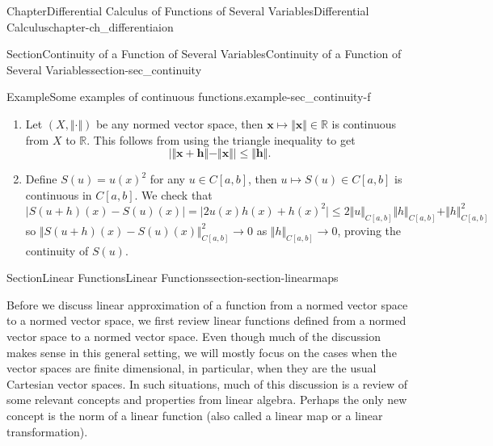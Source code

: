 \documentclass[oneside,10pt,]{book}
\numberwithin{equation}{section}
\newcommand{\bff}{\mathbf{f}}
\newcommand{\bh}{\mathbf{h}}
\newcommand{\bu}{\mathbf{u}}
\newcommand{\bx}{\mathbf{x}}
\newcommand{\bbR}{\mathbb{R}}
\begin{document}
\begin{chapterptx}{Chapter}{Differential Calculus of Functions of Several Variables}{}{Differential Calculus}{}{}{chapter-ch_differentiaion}
\begin{sectionptx}{Section}{Continuity of a Function of Several Variables}{}{Continuity of a Function of Several Variables}{}{}{section-sec_continuity}
\begin{example}{Example}{Some examples of continuous functions.}{example-sec_continuity-f}
\begin{enumerate}[font=\bfseries,label=(\alph*),ref=\alph*]
\par
Suppose \(\bff_1: U\mapsto \bbR^n\) and \(\bff_2: U\mapsto \bbR^n\) are two continuous functions from \(U\) to \(\bbR^n\), then composition with the continuous inner product makes \(\bff_1(\bu)\cdot \bff_2(\bu)\) a continuous function from \(U\) to \(\bbR\).%
\item{}Let \((X, \Vert \cdot \Vert )\) be any normed vector space, then \(\bx \mapsto \Vert \bx\Vert \in \bbR\) is continuous from \(X\) to \(\bbR\). This follows from using the triangle inequality to get%
%
\begin{equation*}
\vert \Vert \bx+\bh\Vert-\Vert \bx\Vert \vert \le \Vert \bh \Vert.
\end{equation*}
\item{}Define \(S(u)=u(x)^{2}\) for any \(u\in C[a, b]\), then \(u\mapsto S(u)\in C[a, b]\) is continuous in \(C[a, b]\). We check that%
\begin{equation*}
\vert S(u+h)(x)-S(u)(x)\vert =\vert 2 u(x)h(x)+h(x)^{2}\vert \le 2 \Vert u \Vert_{C[a, b]} \Vert h\Vert_{C[a, b]}+
\Vert h\Vert_{C[a, b]}^{2}
\end{equation*}
so \(\Vert S(u+h)(x)-S(u)(x)\Vert_{C[a, b]}^{2} \to 0\) as \(\Vert h\Vert_{C[a, b]} \to 0\), proving the continuity of \(S(u)\).%
\end{enumerate}
\end{example}
\end{sectionptx}
%
%
\typeout{************************************************}
\typeout{************************************************}
%
\begin{sectionptx}{Section}{Linear Functions}{}{Linear Functions}{}{}{section-section-linearmaps}
\begin{introduction}{}%
Before we discuss linear approximation of a function  from a normed vector space to a normed vector space, we first review linear functions defined from  a normed vector space to a normed vector space.  Even though much of the discussion makes sense in this general setting, we will mostly focus on the cases when the vector spaces are finite dimensional, in particular, when they are the usual Cartesian vector spaces. In such situations, much of this discussion is a review of some relevant concepts and properties from linear algebra.  Perhaps the only new concept is the norm of a linear function (also called a linear map or a linear transformation).%
\end{introduction}%
%
%
\typeout{************************************************}

\end{sectionptx}
\end{chapterptx}
\end{document}
